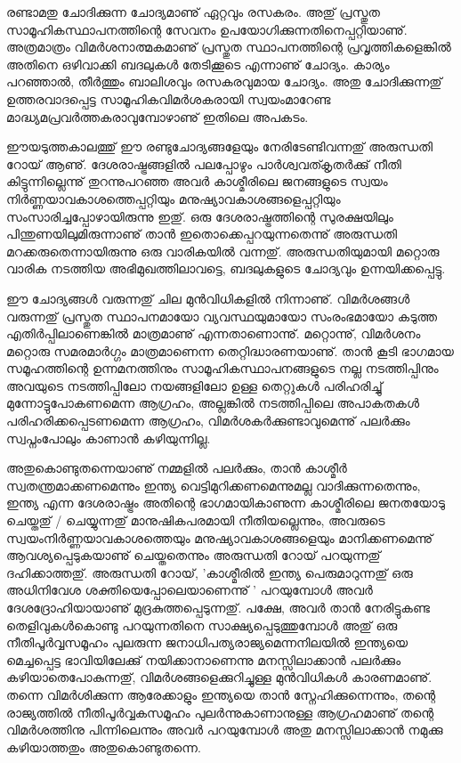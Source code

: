 രണ്ടാമതു ചോദിക്കുന്ന ചോദ്യമാണു് ഏറ്റവും രസകരം. അതു് പ്രസ്തുത സാമൂഹികസ്ഥാപനത്തിന്റെ സേവനം ഉപയോഗിക്കുന്നതിനെപ്പറ്റിയാണു്.
 അത്രമാത്രം വിമര്‍ശനാത്മകമാണു് പ്രസ്തുത സ്ഥാപനത്തിന്റെ പ്രവൃത്തികളെങ്കില്‍ അതിനെ ഒഴിവാക്കി ബദലുകള്‍ തേടിക്കൂടെ എന്നാണു് ചോദ്യം.
  കാര്യം പറഞ്ഞാല്‍, തീര്‍ത്തും ബാലിശവും രസകരവുമായ ചോദ്യം. അതു ചോദിക്കുന്നതു് ഉത്തരവാദപ്പെട്ട സാമൂഹികവിമര്‍ശകരായി 
  സ്വയംമാറേണ്ട മാദ്ധ്യമപ്രവര്‍ത്തകരാവുമ്പോഴാണു് ഇതിലെ അപകടം.

ഈയടുത്തകാലത്തു് ഈ രണ്ടുചോദ്യങ്ങളേയും നേരിടേണ്ടിവന്നതു് അരുന്ധതി റോയ് ആണു്. ദേശരാഷ്ട്രങ്ങളില്‍ പലപ്പോഴും 
പാര്‍ശ്വവത്കൃതര്‍ക്കു് നീതി കിട്ടുന്നില്ലെന്നു് തുറന്നുപറഞ്ഞ അവര്‍ കാശ്മീരിലെ ജനങ്ങളുടെ സ്വയം നിര്‍ണ്ണയാവകാശത്തെപ്പറ്റിയും
 മനുഷ്യാവകാശങ്ങളെപ്പറ്റിയും സംസാരിച്ചപ്പോഴായിരുന്നു ഇതു്. ഒരു ദേശരാഷ്ട്രത്തിന്റെ സുരക്ഷയിലും പിന്തുണയിലുമിരുന്നാണു് 
 താന്‍ ഇതൊക്കെപ്പറയുന്നതെന്നു് അരുന്ധതി മറക്കരുതെന്നായിരുന്നു ഒരു വാരികയില്‍ വന്നതു്. അരുന്ധതിയുമായി മറ്റൊരു 
 വാരിക നടത്തിയ അഭിമുഖത്തിലാവട്ടെ, ബദലുകളുടെ ചോദ്യവും ഉന്നയിക്കപ്പെട്ടു.

ഈ ചോദ്യങ്ങള്‍ വരുന്നതു് ചില മുന്‍വിധികളില്‍ നിന്നാണു്. വിമര്‍ശങ്ങള്‍ വരുന്നതു് പ്രസ്തുത സ്ഥാപനമായോ വ്യവസ്ഥയുമായോ
 സംരംഭമായോ കടുത്ത എതിര്‍പ്പിലാണെങ്കില്‍ മാത്രമാണു് എന്നതാണൊന്നു്. മറ്റൊന്നു്, വിമര്‍ശനം മറ്റൊരു സമരമാര്‍ഗ്ഗം
  മാത്രമാണെന്ന തെറ്റിദ്ധാരണയാണു്. താന്‍ കൂടി ഭാഗമായ സമൂഹത്തിന്റെ ഉന്നമനത്തിനും സാമൂഹികസ്ഥാപനങ്ങളുടെ നല്ല 
  നടത്തിപ്പിനും അവയുടെ നടത്തിപ്പിലോ നയങ്ങളിലോ ഉള്ള തെറ്റുകള്‍ പരിഹരിച്ചു് മുന്നോട്ടുപോകണമെന്ന ആഗ്രഹം, അല്ലങ്കില്‍ 
  നടത്തിപ്പിലെ അപാകതകള്‍ പരിഹരിക്കപ്പെടണമെന്ന ആഗ്രഹം, വിമര്‍ശകര്‍ക്കുണ്ടാവുമെന്നു് പലര്‍ക്കും സ്വപ്നംപോലും കാണാന്‍ 
  കഴിയുന്നില്ല.

അതുകൊണ്ടുതന്നെയാണു് നമ്മളില്‍ പലര്‍ക്കും, താന്‍ കാശ്മീര്‍ സ്വതന്ത്രമാക്കണമെന്നും ഇന്ത്യ വെട്ടിമുറിക്കണമെന്നുമല്ല 
വാദിക്കുന്നതെന്നും, ഇന്ത്യ എന്ന ദേശരാഷ്ട്രം അതിന്റെ ഭാഗമായികാണുന്ന കാശ്മീരിലെ ജനതയോടു ചെയ്തതു് / ചെയ്യുന്നതു് മാനുഷികപരമായി 
നീതിയല്ലെന്നും, അവരുടെ സ്വയംനിര്‍ണ്ണയാവകാശത്തെയും മനുഷ്യാവകാശങ്ങളെയും മാനിക്കണമെന്നു് ആവശ്യപ്പെടുകയാണു് ചെയ്തതെന്നും
 അരുന്ധതി റോയ് പറയുന്നതു് ദഹിക്കാത്തതു്. അരുന്ധതി റോയ്, 'കാശ്മീരില്‍ ഇന്ത്യ പെരുമാറുന്നതു് ഒരു അധിനിവേശ ശക്തിയെപ്പോലെയാണെന്നു് '  പറയുമ്പോള്‍ അവര്‍ ദേശദ്രോഹിയായാണു് മുദ്രകുത്തപ്പെടുന്നതു്. പക്ഷേ, അവര്‍ താന്‍ നേരിട്ടുകണ്ട തെളിവുകള്‍കൊണ്ടു പറയുന്നതിനെ
  സാക്ഷ്യപ്പെടുത്തുമ്പോള്‍ അതു് ഒരു നീതിപൂര്‍വ്വസമൂഹം പുലരുന്ന ജനാധിപത്യരാജ്യമെന്നനിലയില്‍ ഇന്ത്യയെ മെച്ചപ്പെട്ട ഭാവിയിലേക്കു് 
  നയിക്കാനാണെന്നു മനസ്സിലാക്കാന്‍ പലര്‍ക്കും കഴിയാതെപോകുന്നതു്, വിമര്‍ശങ്ങളെക്കുറിച്ചുള്ള മുന്‍വിധികള്‍ കാരണമാണു്.  
  തന്നെ വിമര്‍ശിക്കുന്ന ആരേക്കാളും ഇന്ത്യയെ താന്‍ സ്നേഹിക്കുന്നെന്നും, തന്റെ രാജ്യത്തില്‍ നീതിപൂര്‍വ്വകസമൂഹം പുലര്‍ന്നുകാണാനുള്ള 
  ആഗ്രഹമാണു് തന്റെ വിമര്‍ശത്തിനു പിന്നിലെന്നും അവര്‍ പറയുമ്പോള്‍ അതു മനസ്സിലാക്കാന്‍ നമുക്കു കഴിയാത്തതും അതുകൊണ്ടുതന്നെ.

